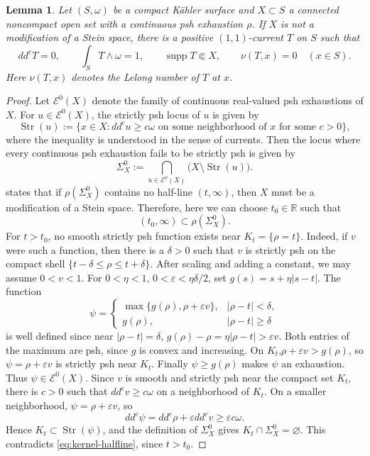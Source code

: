\documentclass[11pt]{amsart}
\newtheorem{lemma}[theorem]{Lemma}
\theoremstyle{definition}
\theoremstyle{remark}
\numberwithin{equation}{section}
\newcommand{\R}{\mathbb R}
\newcommand{\ddc}{dd^c}
\newcommand{\supp}{\operatorname{supp}}
\begin{document}
\begin{lemma}\label{lem:level-averaging}
Let $(S,\omega)$ be a compact K\"ahler surface and $X\subset S$
a connected noncompact open set with a continuous psh exhaustion
$\rho$. If $X$ is not a modification of a Stein space, there is
a positive $(1,1)$-current $T$ on $S$ such that
\begin{equation}\label{eq:averaged-current-properties}
 \ddc T=0,\qquad \int_S T\wedge\omega=1,\qquad
 \supp T\Subset X,\qquad \nu(T,x)=0\quad(x\in S).
\end{equation}
Here $\nu(T,x)$ denotes the Lelong number of $T$ at $x$.
\end{lemma}
\begin{proof}
Let $\mathcal E^0(X)$ denote the family of continuous real-valued
psh exhaustions of $X$. For $u\in\mathcal E^0(X)$, the strictly psh locus of $u$ is given by
\[
 \operatorname{Str}(u)
 :=
 \{x\in X:\ddc u\ge c\omega
   \text{ on some neighborhood of }x
   \text{ for some }c>0\},
\]
where the inequality is understood in the sense of currents.
Then the locus where every continuous psh exhaustion fails to be strictly psh is given by
\[
 \Sigma_X^0
 :=
 \bigcap_{u\in\mathcal E^0(X)}
 \bigl(X\setminus\operatorname{Str}(u)\bigr).
\]
\cite[Lemma~2.1]{MongodiSlodkowski2020} states that if $\rho(\Sigma_X^0)$ contains no half-line $(t,\infty)$, then $X$ must be a modification of a Stein space. Therefore, here we can choose $t_0\in\R$ such that
\begin{equation}\label{eq:kernel-halfline}
 (t_0,\infty)\subset\rho(\Sigma_X^0).
\end{equation}
For $t>t_0$, no smooth strictly psh function exists
near $K_t=\{\rho=t\}$. Indeed, if $v$ were such a function,
then there is a $\delta>0$ such that $v$ is strictly psh on the compact shell
$\{t-\delta\le\rho\le t+\delta\}$.
After scaling and adding a constant, we may assume $0<v<1$. For
$0<\eta<1$, $0<\varepsilon<\eta\delta/2$, set
$g(s)=s+\eta|s-t|$. The function
\[
 \psi=
 \begin{cases}
 \max\{g(\rho),\rho+\varepsilon v\},& |\rho-t|<\delta,\\
 g(\rho),& |\rho-t|\ge\delta
 \end{cases}
\]
is well defined since near $|\rho-t|=\delta$,
$g(\rho)-\rho=\eta|\rho-t|>\varepsilon v$. Both entries of the
maximum are psh, since $g$ is convex and increasing.
On $K_t$,$\rho+\varepsilon v>g(\rho)$, so
$\psi=\rho+\varepsilon v$ is strictly psh near $K_t$.
Finally $\psi\ge g(\rho)$ makes $\psi$ an exhaustion.
Thus $\psi\in\mathcal E^0(X)$. Since $v$ is smooth and strictly
psh near the compact set $K_t$, there is $c>0$ such that
$\ddc v\ge c\omega$ on a neighborhood of $K_t$.
On a smaller neighborhood, $\psi=\rho+\varepsilon v$, so
\[
 \ddc\psi
 =\ddc\rho+\varepsilon\ddc v
 \ge\varepsilon c\omega.
\]
Hence $K_t\subset\operatorname{Str}(\psi)$, and the definition
of $\Sigma_X^0$ gives $K_t\cap\Sigma_X^0=\varnothing$.
This contradicts \eqref{eq:kernel-halfline}, since $t>t_0$.


\end{proof}
\end{document}
